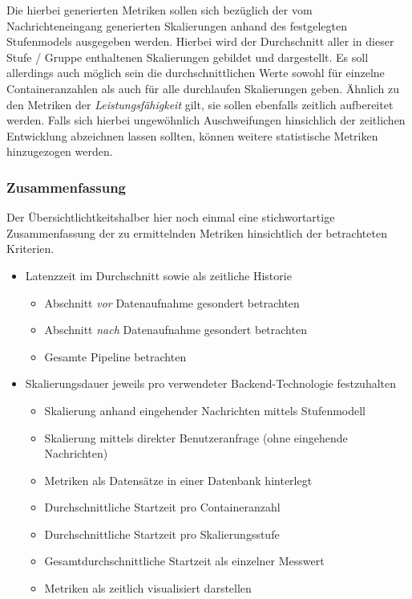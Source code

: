 Die hierbei generierten Metriken sollen sich bezüglich der vom Nachrichteneingang generierten Skalierungen anhand des festgelegten Stufenmodels ausgegeben werden. Hierbei wird der Durchschnitt aller in dieser Stufe / Gruppe enthaltenen Skalierungen gebildet und dargestellt. Es soll allerdings auch möglich sein die durchschnittlichen Werte sowohl für einzelne Containeranzahlen als auch für alle durchlaufen Skalierungen geben. Ähnlich zu den Metriken der \emph{Leistungsfähigkeit} gilt, sie sollen ebenfalls zeitlich aufbereitet werden. Falls sich hierbei ungewöhnlich Auschweifungen hinsichlich der zeitlichen Entwicklung abzeichnen lassen sollten, können weitere statistische Metriken hinzugezogen werden. 



\subsubsection{Zusammenfassung}
Der Übersichtlichtkeitshalber hier noch einmal eine stichwortartige Zusammenfassung der zu ermittelnden Metriken hinsichtlich der betrachteten Kriterien.

\begin{itemize}
  \item Latenzzeit im Durchschnitt sowie als zeitliche Historie
  \begin{itemize}
    \item Abschnitt \emph{vor} Datenaufnahme gesondert betrachten
    \item Abschnitt \emph{nach} Datenaufnahme gesondert betrachten
    \item Gesamte Pipeline betrachten
  \end{itemize}
  \item Skalierungsdauer jeweils pro verwendeter Backend-Technologie festzuhalten
  \begin{itemize}
    \item Skalierung anhand eingehender Nachrichten mittels Stufenmodell
    \item Skalierung mittels direkter Benutzeranfrage (ohne eingehende Nachrichten)
    \item Metriken als Datensätze in einer Datenbank hinterlegt
    \item Durchschnittliche Startzeit pro Containeranzahl 
    \item Durchschnittliche Startzeit pro Skalierungsstufe 
    \item Gesamtdurchschnittliche Startzeit als einzelner Messwert
    \item Metriken als zeitlich visualisiert darstellen
  \end{itemize}
\end{itemize}